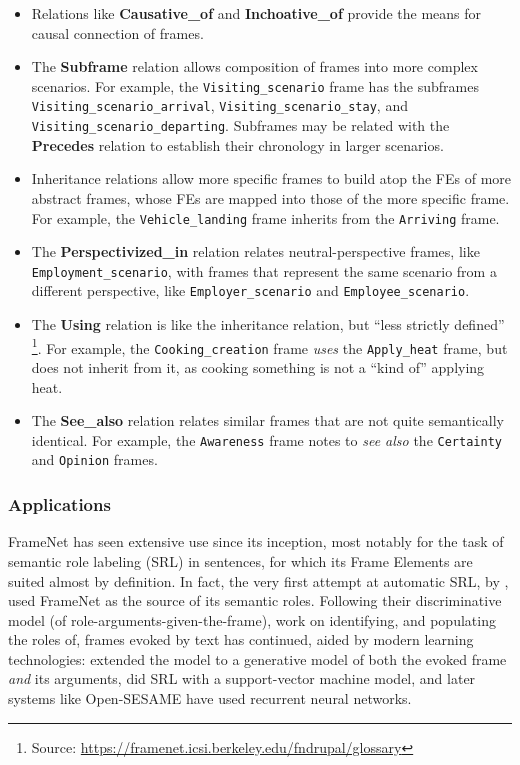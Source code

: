 \begin{itemize}
\item Relations like \textbf{Causative\_of} and \textbf{Inchoative\_of} provide the means for causal connection of frames.

\item The \textbf{Subframe} relation allows composition of frames into more complex scenarios. For example, the \texttt{Visiting\_scenario} frame has the subframes \texttt{Visiting\_scenario\_arrival}, \texttt{Visiting\_scenario\_stay}, and \texttt{Visiting\_scenario\_departing}. Subframes may be related with the \textbf{Precedes} relation to establish their chronology in larger scenarios.

\item Inheritance relations allow more specific frames to build atop the FEs of more abstract frames, whose FEs are mapped into those of the more specific frame. For example, the \texttt{Vehicle\_landing} frame inherits from the \texttt{Arriving} frame.

\item The \textbf{Perspectivized\_in} relation relates neutral-perspective frames, like \texttt{Employment\_scenario}, with frames that represent the same scenario from a different perspective, like \texttt{Employer\_scenario} and \texttt{Employee\_scenario}.

\item The \textbf{Using} relation is like the inheritance relation, but ``less strictly defined'' \footnote{Source: \url{https://framenet.icsi.berkeley.edu/fndrupal/glossary}}. For example, the \texttt{Cooking\_creation} frame \textit{uses} the \texttt{Apply\_heat} frame, but does not inherit from it, as cooking something is not a ``kind of'' applying heat.

\item The \textbf{See\_also} relation relates similar frames that are not quite semantically identical. For example, the \texttt{Awareness} frame notes to \textit{see also} the \texttt{Certainty} and \texttt{Opinion} frames.

\end{itemize}

\subsubsection{Applications}
\label{sec:srl}
FrameNet has seen extensive use since its inception, most notably for the task of semantic role labeling (SRL) in sentences, for which its Frame Elements are suited almost by definition. In fact, the very first attempt at automatic SRL, by \citet{gildea2002automatic}, used FrameNet as the source of its semantic roles. Following their discriminative model (of role-arguments-given-the-frame), work on identifying, and populating the roles of, frames evoked by text has continued, aided by modern learning technologies: \citet{thompson2003generative} extended the model to a generative model of both the evoked frame \textit{and} its arguments, \citet{giuglea2006semantic} did SRL with a support-vector machine model, and later systems like Open-SESAME \citep{opensesame} have used recurrent neural networks.

